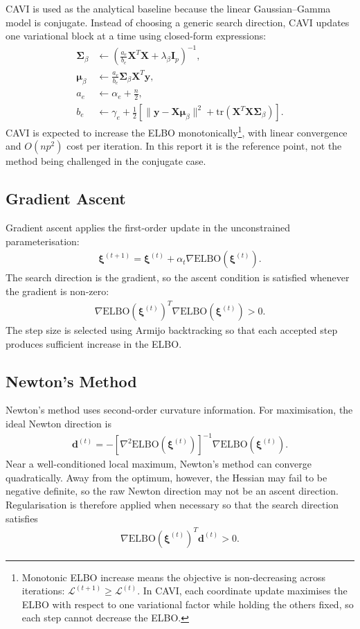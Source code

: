 \documentclass[11pt,a4paper]{article}
\newcommand{\ELBO}{\text{ELBO}}
\newcommand{\tr}{\text{tr}}
\begin{document}
CAVI is used as the analytical baseline because the linear Gaussian--Gamma model is conjugate. Instead of choosing a generic search direction, CAVI updates one variational block at a time using closed-form expressions:
\begin{align}
\bm{\Sigma}_\beta &\leftarrow \left(\frac{a_e}{b_e} \bm{X}^T\bm{X} + \lambda_\beta \bm{I}_p\right)^{-1},\\
\bm{\mu}_\beta &\leftarrow \frac{a_e}{b_e} \bm{\Sigma}_\beta \bm{X}^T\bm{y},\\
a_e &\leftarrow \alpha_e + \frac{n}{2},\\
b_e &\leftarrow \gamma_e + \frac{1}{2}\left[\|\bm{y} - \bm{X}\bm{\mu}_\beta\|^2 + \tr(\bm{X}^T\bm{X}\bm{\Sigma}_\beta)\right].
\end{align}
CAVI is expected to increase the ELBO monotonically\footnote{Monotonic ELBO increase means the objective is non-decreasing across iterations: $\mathcal{L}^{(t+1)} \geq \mathcal{L}^{(t)}$. In CAVI, each coordinate update maximises the ELBO with respect to one variational factor while holding the others fixed, so each step cannot decrease the ELBO.}, with linear convergence and $O(np^2)$ cost per iteration. In this report it is the reference point, not the method being challenged in the conjugate case.

\subsection{Gradient Ascent}

Gradient ascent applies the first-order update in the unconstrained parameterisation:
\begin{align}
\bm{\xi}^{(t+1)} = \bm{\xi}^{(t)} + \alpha_t \nabla\ELBO(\bm{\xi}^{(t)}).
\end{align}
The search direction is the gradient, so the ascent condition is satisfied whenever the gradient is non-zero:
\begin{align}
\nabla\ELBO(\bm{\xi}^{(t)})^T \nabla\ELBO(\bm{\xi}^{(t)}) > 0.
\end{align}
The step size is selected using Armijo backtracking so that each accepted step produces sufficient increase in the ELBO.

\subsection{Newton's Method}

Newton's method uses second-order curvature information. For maximisation, the ideal Newton direction is
\begin{align}
\bm{d}^{(t)} = -[\nabla^2\ELBO(\bm{\xi}^{(t)})]^{-1}\nabla\ELBO(\bm{\xi}^{(t)}).
\end{align}
Near a well-conditioned local maximum, Newton's method can converge quadratically. Away from the optimum, however, the Hessian may fail to be negative definite, so the raw Newton direction may not be an ascent direction. Regularisation is therefore applied when necessary so that the search direction satisfies
\begin{align}
\nabla\ELBO(\bm{\xi}^{(t)})^T\bm{d}^{(t)} > 0.
\end{align}
\end{document}
